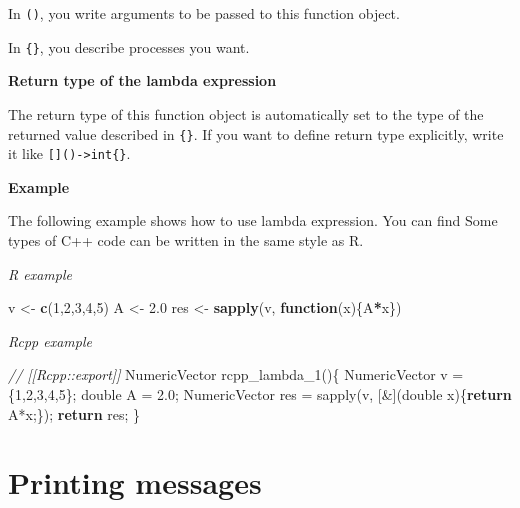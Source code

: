 \documentclass[]{book}
\newenvironment{Shaded}{\begin{snugshade}}{\end{snugshade}}
\newcommand{\CommentTok}[1]{\textcolor[rgb]{0.56,0.35,0.01}{\textit{#1}}}
\newcommand{\ControlFlowTok}[1]{\textcolor[rgb]{0.13,0.29,0.53}{\textbf{#1}}}
\newcommand{\DataTypeTok}[1]{\textcolor[rgb]{0.13,0.29,0.53}{#1}}
\newcommand{\DecValTok}[1]{\textcolor[rgb]{0.00,0.00,0.81}{#1}}
\newcommand{\FloatTok}[1]{\textcolor[rgb]{0.00,0.00,0.81}{#1}}
\newcommand{\KeywordTok}[1]{\textcolor[rgb]{0.13,0.29,0.53}{\textbf{#1}}}
\newcommand{\NormalTok}[1]{#1}
\newcommand{\OperatorTok}[1]{\textcolor[rgb]{0.81,0.36,0.00}{\textbf{#1}}}
\newcommand{\StringTok}[1]{\textcolor[rgb]{0.31,0.60,0.02}{#1}}
\begin{document}
In \texttt{()}, you write arguments to be passed to this function object.

In \texttt{\{\}}, you describe processes you want.

\textbf{Return type of the lambda expression}

The return type of this function object is automatically set to the type of the returned value described in \texttt{\{\}}. If you want to define return type explicitly, write it like \texttt{{[}{]}()-\textgreater{}int\{\}}.

\textbf{Example}

The following example shows how to use lambda expression. You can find Some types of C++ code can be written in the same style as R.

\emph{R example}

\begin{Shaded}
\begin{Highlighting}[]
\NormalTok{v <-}\StringTok{ }\KeywordTok{c}\NormalTok{(}\DecValTok{1}\NormalTok{,}\DecValTok{2}\NormalTok{,}\DecValTok{3}\NormalTok{,}\DecValTok{4}\NormalTok{,}\DecValTok{5}\NormalTok{)}
\NormalTok{A <-}\StringTok{ }\FloatTok{2.0}
\NormalTok{res <-}
\StringTok{  }\KeywordTok{sapply}\NormalTok{(v, }\ControlFlowTok{function}\NormalTok{(x)\{A}\OperatorTok{*}\NormalTok{x\})}
\end{Highlighting}
\end{Shaded}

\emph{Rcpp example}

\begin{Shaded}
\begin{Highlighting}[]
\CommentTok{// [[Rcpp::export]]}
\NormalTok{NumericVector rcpp_lambda_1()\{}
\NormalTok{  NumericVector v = \{}\DecValTok{1}\NormalTok{,}\DecValTok{2}\NormalTok{,}\DecValTok{3}\NormalTok{,}\DecValTok{4}\NormalTok{,}\DecValTok{5}\NormalTok{\};}
  \DataTypeTok{double}\NormalTok{ A = }\FloatTok{2.0}\NormalTok{;}
\NormalTok{  NumericVector res =}
\NormalTok{    sapply(v, [&](}\DataTypeTok{double}\NormalTok{ x)\{}\ControlFlowTok{return}\NormalTok{ A*x;\});}
  \ControlFlowTok{return}\NormalTok{ res;}
\NormalTok{\}}
\end{Highlighting}
\end{Shaded}

\hypertarget{printing-messages}{%
\chapter{Printing messages}\label{printing-messages}}
\end{document}
